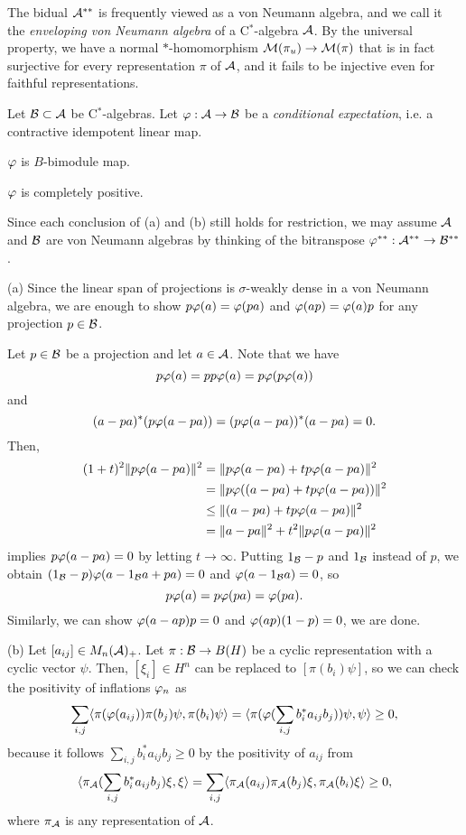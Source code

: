 \documentclass{../../../small}
\begin{document}
\begin{rmk}
The bidual $\mathcal{A}^{**}$ is frequently viewed as a von Neumann algebra, and we call it the \emph{enveloping von Neumann algebra} of a C$^*$-algebra $\mathcal{A}$.
By the universal property, we have a normal $*$-homomorphism $\mathcal{M}(\pi_u)\to\mathcal{M}(\pi)$ that is in fact surjective for every representation $\pi$ of $\mathcal{A}$, and it fails to be injective even for faithful representations.
\end{rmk}

\begin{thm}[Tomiyama]
Let $\mathcal{B}\subset\mathcal{A}$ be C$^*$-algebras.
Let $\varphi:\mathcal{A}\to\mathcal{B}$ be a \emph{conditional expectation}, i.e. a contractive idempotent linear map.
\begin{parts}
\item $\varphi$ is $B$-bimodule map.
\item $\varphi$ is completely positive.
\end{parts}
\end{thm}
\begin{pf}
Since each conclusion of (a) and (b) still holds for restriction, we may assume $\mathcal{A}$ and $\mathcal{B}$ are von Neumann algebras by thinking of the bitranspose $\varphi^{**}:\mathcal{A}^{**}\to\mathcal{B}^{**}$.

(a)
Since the linear span of projections is $\sigma$-weakly dense in a von Neumann algebra, we are enough to show $p\varphi(a)=\varphi(pa)$ and $\varphi(ap)=\varphi(a)p$ for any projection $p\in\mathcal{B}$.

Let $p\in\mathcal{B}$ be a projection and let $a\in\mathcal{A}$.
Note that we have
\[p\varphi(a)=pp\varphi(a)=p\varphi(p\varphi(a))\]
and
\[(a-pa)^*(p\varphi(a-pa))=(p\varphi(a-pa))^*(a-pa)=0.\]
Then,
\begin{align*}
(1+t)^2\|p\varphi(a-pa)\|^2
&=\|p\varphi(a-pa)+tp\varphi(a-pa)\|^2\\
&=\|p\varphi((a-pa)+tp\varphi(a-pa))\|^2\\
&\le\|(a-pa)+tp\varphi(a-pa)\|^2\\
&=\|a-pa\|^2+t^2\|p\varphi(a-pa)\|^2
\end{align*}
implies $p\varphi(a-pa)=0$ by letting $t\to\infty$.
Putting $1_{\mathcal{B}}-p$ and $1_{\mathcal{B}}$ instead of $p$, we obtain $(1_{\mathcal{B}}-p)\varphi(a-1_{\mathcal{B}} a+pa)=0$ and $\varphi(a-1_{\mathcal{B}} a)=0$, so
\[p\varphi(a)=p\varphi(pa)=\varphi(pa).\]
Similarly, we can show $\varphi(a-ap)p=0$ and $\varphi(ap)(1-p)=0$, we are done.

(b)
Let $[a_{ij}]\in M_n(\mathcal{A})_+$.
Let $\pi:\mathcal{B}\to B(H)$ be a cyclic representation with a cyclic vector $\psi$.
Then, $[\xi_i]\in H^n$ can be replaced to $[\pi(b_i)\psi]$, so we can check the positivity of inflations $\varphi_n$ as
\[\sum_{i,j}\langle\pi(\varphi(a_{ij}))\pi(b_j)\psi,\pi(b_i)\psi\rangle=\langle\pi(\varphi(\sum_{i,j}b_i^*a_{ij}b_j))\psi,\psi\rangle\ge0,\]
because it follows $\sum_{i,j}b_i^*a_{ij}b_j\ge0$ by the positivity of $a_{ij}$ from
\[\langle\pi_{\mathcal{A}}(\sum_{i,j}b_i^*a_{ij}b_j)\xi,\xi\rangle=\sum_{i,j}\langle\pi_{\mathcal{A}}(a_{ij})\pi_{\mathcal{A}}(b_j)\xi,\pi_{\mathcal{A}}(b_i)\xi\rangle\ge0,\]
where $\pi_{\mathcal{A}}$ is any representation of $\mathcal{A}$.
\end{pf}
\end{document}
